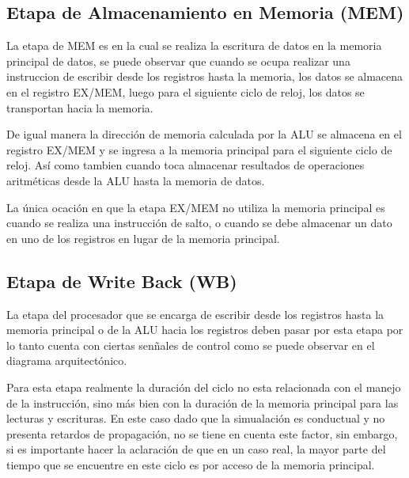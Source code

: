 \subsection{Etapa de Almacenamiento en Memoria (MEM)}
La etapa de MEM es en la cual se realiza la escritura de datos en la memoria principal de datos, se puede observar que cuando se ocupa realizar una instruccion de escribir desde los registros hasta la memoria, los datos se almacena en el registro EX/MEM, luego para el siguiente ciclo de reloj, los datos se transportan hacia la memoria. 

De igual manera la direcci\' on de memoria calculada por la ALU se almacena en el registro EX/MEM y se ingresa a la memoria principal para el siguiente ciclo de reloj. As\' i como tambien cuando toca almacenar resultados de operaciones aritm\' eticas desde la ALU hasta la memoria de datos.

La \' unica ocaci\' on en que la etapa EX/MEM no utiliza la memoria principal es cuando se realiza una instrucci\' on de salto, o cuando se debe almacenar un dato en uno de los registros en lugar de la memoria principal.




\subsection{Etapa de Write Back (WB)}
La etapa del procesador que se encarga de escribir desde los registros hasta la memoria principal o de la ALU hacia los registros deben pasar por esta etapa por lo tanto cuenta con ciertas sen\~ nales de control como se puede observar en el diagrama arquitect\' onico.

Para esta etapa realmente la duraci\' on del ciclo no esta relacionada con el manejo de la instrucci\' on, sino m\' as bien con la duraci\' on de la memoria principal para las lecturas y escrituras. En este caso  dado que la simualaci\' on es conductual y no presenta retardos de propagaci\' on, no se tiene en cuenta este factor, sin embargo, si es importante hacer la aclaraci\' on de que en un caso real, la mayor parte del tiempo que se encuentre en este ciclo es por acceso de la memoria principal.


